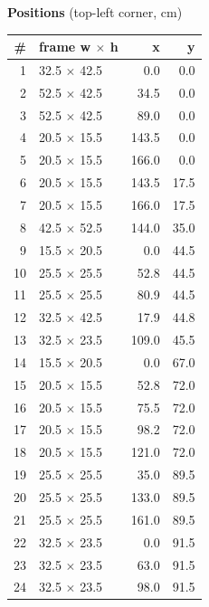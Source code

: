 \documentclass[a4paper,landscape,10pt]{article}
\begin{document}
\begin{minipage}[t]{0.25\textwidth}
\vspace{8pt}
{\bfseries Positions} (top-left corner, cm)\\[2pt]
\tiny
\begin{tabular}{@{}r l r r@{}}
\toprule
\# & frame w $\times$ h & x & y \\
\midrule
1 & 32.5 $\times$ 42.5 & 0.0 & 0.0 \\
2 & 52.5 $\times$ 42.5 & 34.5 & 0.0 \\
3 & 52.5 $\times$ 42.5 & 89.0 & 0.0 \\
4 & 20.5 $\times$ 15.5 & 143.5 & 0.0 \\
5 & 20.5 $\times$ 15.5 & 166.0 & 0.0 \\
6 & 20.5 $\times$ 15.5 & 143.5 & 17.5 \\
7 & 20.5 $\times$ 15.5 & 166.0 & 17.5 \\
8 & 42.5 $\times$ 52.5 & 144.0 & 35.0 \\
9 & 15.5 $\times$ 20.5 & 0.0 & 44.5 \\
10 & 25.5 $\times$ 25.5 & 52.8 & 44.5 \\
11 & 25.5 $\times$ 25.5 & 80.9 & 44.5 \\
12 & 32.5 $\times$ 42.5 & 17.9 & 44.8 \\
13 & 32.5 $\times$ 23.5 & 109.0 & 45.5 \\
14 & 15.5 $\times$ 20.5 & 0.0 & 67.0 \\
15 & 20.5 $\times$ 15.5 & 52.8 & 72.0 \\
16 & 20.5 $\times$ 15.5 & 75.5 & 72.0 \\
17 & 20.5 $\times$ 15.5 & 98.2 & 72.0 \\
18 & 20.5 $\times$ 15.5 & 121.0 & 72.0 \\
19 & 25.5 $\times$ 25.5 & 35.0 & 89.5 \\
20 & 25.5 $\times$ 25.5 & 133.0 & 89.5 \\
21 & 25.5 $\times$ 25.5 & 161.0 & 89.5 \\
22 & 32.5 $\times$ 23.5 & 0.0 & 91.5 \\
23 & 32.5 $\times$ 23.5 & 63.0 & 91.5 \\
24 & 32.5 $\times$ 23.5 & 98.0 & 91.5 \\
\bottomrule
\end{tabular}
\end{minipage}
\clearpage
\end{document}
